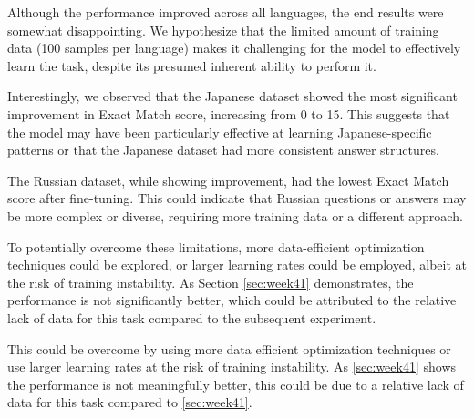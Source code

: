 \documentclass[11pt]{article}
\begin{document}
\begin{table}[ht]
    \centering
    \caption{Performance comparison of pre-fine-tuned and fine-tuned Llama-3-8B models}
    \label{fig:llama3_performance_comparison_week40}
\end{table}

Although the performance improved across all languages, the end results were somewhat disappointing.
We hypothesize that the limited amount of training data (100 samples per language) makes it challenging for the model to effectively learn the task, despite its presumed inherent ability to perform it.

Interestingly, we observed that the Japanese dataset showed the most significant improvement in Exact Match score, increasing from 0 to 15. This suggests that the model may have been particularly effective at learning Japanese-specific patterns or that the Japanese dataset had more consistent answer structures.

The Russian dataset, while showing improvement, had the lowest Exact Match score after fine-tuning. This could indicate that Russian questions or answers may be more complex or diverse, requiring more training data or a different approach.

To potentially overcome these limitations, more data-efficient optimization techniques could be explored, or larger learning rates could be employed, albeit at the risk of training instability.
As Section \ref{sec:week41} demonstrates, the performance is not significantly better, which could be attributed to the relative lack of data for this task compared to the subsequent experiment.

This could be overcome by using more data efficient optimization techniques or use larger learning rates at the risk of training instability.
As \ref{sec:week41} shows the performance is not meaningfully better, this could be due to a relative lack of data for this task compared to \ref{sec:week41}.
\end{document}
